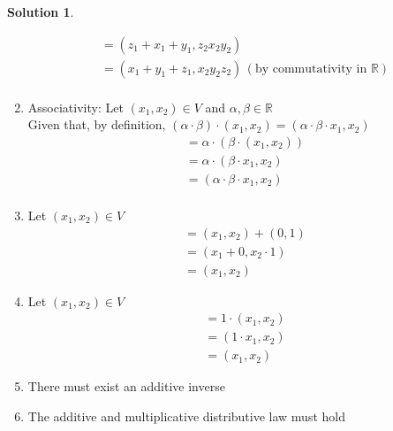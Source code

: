 \documentclass[10pt]{article}
\theoremstyle{definition}
\newtheorem{soln}{Solution}
\begin{document}
\begin{soln}
\begin{enumerate}[label=(\roman*)]
\begin{align*}
             & =(z_1 + x_1 + y_1, z_2x_2y_2)                                                          \\
             & =(x_1 + y_1 + z_1 , x_2y_2z_2) \, (\text{by commutativity in } \mathbb{R})             \\
          \end{align*}
    \item Associativity: Let $(x_1, x_2)\in V$ and $\alpha,\beta\in\mathbb{R}$\\
          Given that, by definition, $(\alpha\cdot\beta)\cdot(x_1, x_2)=(\alpha\cdot\beta\cdot x_1, x_2)$
          \begin{align*}
             & =\alpha\cdot(\beta\cdot(x_1, x_2)) \\
             & =\alpha\cdot(\beta\cdot x_1, x_2)  \\
             & =(\alpha\cdot\beta\cdot x_1, x_2)  \\
          \end{align*}


    \item Let $(x_1, x_2)\in V$
          \begin{align*}
             & = (x_1, x_2) + (0,1)  \\
             & = (x_1+0, x_2\cdot 1) \\
             & = (x_1, x_2)
          \end{align*}
    \item Let $(x_1, x_2)\in V$
    \begin{align*}
      & = 1\cdot(x_1, x_2)  \\
      & = (1\cdot x_1, x_2) \\
      & = (x_1, x_2)
   \end{align*}
    \item There must exist an additive inverse
    \item The additive and multiplicative distributive law must hold
  \end{enumerate}
\end{soln}
\end{document}
